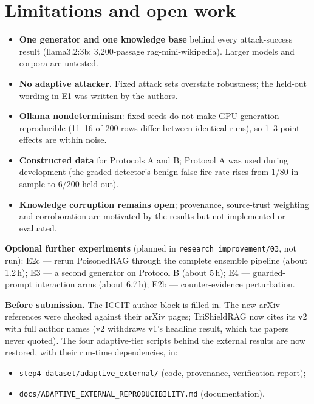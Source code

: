 \documentclass[11pt,a4paper]{article}
\begin{document}
\section{Limitations and open work}

\begin{itemize}
\item \textbf{One generator and one knowledge base} behind every attack-success result (llama3.2:3b; 3,200-passage
  rag-mini-wikipedia). Larger models and corpora are untested.
\item \textbf{No adaptive attacker.} Fixed attack sets overstate robustness; the held-out wording in E1 was written by
  the authors.
\item \textbf{Ollama nondeterminism}: fixed seeds do not make GPU generation reproducible (11--16 of 200 rows differ
  between identical runs), so 1--3-point effects are within noise.
\item \textbf{Constructed data} for Protocols A and B; Protocol A was used during development (the graded detector's
  benign false-fire rate rises from 1/80 in-sample to 6/200 held-out).
\item \textbf{Knowledge corruption remains open}; provenance, source-trust weighting and corroboration are
  motivated by the results but not implemented or evaluated.
\end{itemize}

\textbf{Optional further experiments} (planned in \texttt{research\_improvement/03}, not run):
E2c --- rerun PoisonedRAG through the complete ensemble pipeline (about 1.2\,h); E3 --- a second generator on
Protocol B (about 5\,h); E4 --- guarded-prompt interaction arms (about 6.7\,h); E2b --- counter-evidence
perturbation.

\textbf{Before submission.} The ICCIT author block is filled in. The new arXiv references were checked against their
arXiv pages; TriShieldRAG now cites its v2 with full author names (v2 withdraws v1's headline result, which the
papers never quoted). The four adaptive-tier scripts behind the external results are now
restored, with their run-time dependencies, in:
\begin{itemize}
\item \texttt{step4 dataset/adaptive\_external/} (code, provenance, verification report);
\item \texttt{docs/ADAPTIVE\_EXTERNAL\_REPRODUCIBILITY.md} (documentation).
\end{itemize}
\end{document}
